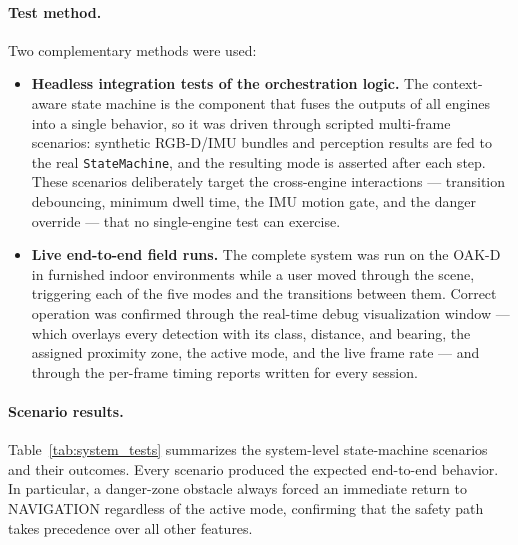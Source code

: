 \paragraph{Test method.} Two complementary methods were used:
\begin{itemize}
    \item \textbf{Headless integration tests of the orchestration logic.} The context-aware state machine is the component that fuses the outputs of all engines into a single behavior, so it was driven through scripted multi-frame scenarios: synthetic RGB-D/IMU bundles and perception results are fed to the real \texttt{StateMachine}, and the resulting mode is asserted after each step. These scenarios deliberately target the cross-engine interactions --- transition debouncing, minimum dwell time, the IMU motion gate, and the danger override --- that no single-engine test can exercise.
    \item \textbf{Live end-to-end field runs.} The complete system was run on the OAK-D in furnished indoor environments while a user moved through the scene, triggering each of the five modes and the transitions between them. Correct operation was confirmed through the real-time debug visualization window --- which overlays every detection with its class, distance, and bearing, the assigned proximity zone, the active mode, and the live frame rate --- and through the per-frame timing reports written for every session.
\end{itemize}

\paragraph{Scenario results.} Table~\ref{tab:system_tests} summarizes the system-level state-machine scenarios and their outcomes. Every scenario produced the expected end-to-end behavior. In particular, a danger-zone obstacle always forced an immediate return to NAVIGATION regardless of the active mode, confirming that the safety path takes precedence over all other features.

